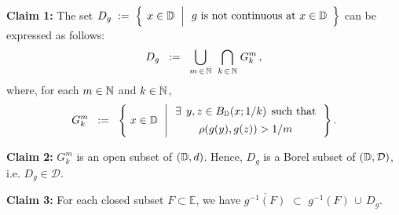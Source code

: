 \vskip 0.3cm
\noindent
\textbf{Claim 1:}\;\;
The set\;
$D_{g}
\; := \;
	\left\{\;\left.
		x\overset{{\color{white}.}}{\in}\D
		\;\;\right\vert
		\begin{array}{c}\textnormal{$g$ is not continuous at $x\in\D$}\end{array}
		\right\}$
\;can be expressed as follows:
\begin{equation*}
D_{g}
\;\; := \;\;
	\underset{m\,\in\,\mathbb{N}}{\bigcup}\;\;
	\underset{k\,\in\,\mathbb{N}}{\bigcap}\;
	G^{m}_{k}\,,
\end{equation*}
where, for each $m\in\mathbb{N}$ and $k\in\mathbb{N}$,
\begin{equation*}
G^{m}_{k}
\;\; := \;\;
	\left\{\;
		x\overset{{\color{white}.}}{\in}\D
		\;\,\left\vert\,
		\begin{array}{c} \exists \;\,y,z \in B_{\D}(x;1/k) \;\,\textnormal{such that} \\ \rho(g(y),g(z)) \overset{{\color{white}-}}{>} 1/m \end{array}
		\right.
		\right\}.
\end{equation*}

\vskip 0.5cm
\noindent
\textbf{Claim 2:}\;\;
$G^{m}_{k}$ is an open subset of $(\mathbb{D},d)$. Hence, $D_{g}$ is a Borel subset of $(\mathbb{D},\mathcal{D})$, i.e. $D_{g} \in \mathcal{D}$.

\vskip 0.5cm
\noindent
\textbf{Claim 3:}\;\;
For each closed subset $F \subset \mathbb{E}$, we have\;
$\overline{g^{-1}(F)}$ \;$\subset$\; $g^{-1}(F)\,\cup\,D_{g}$.

